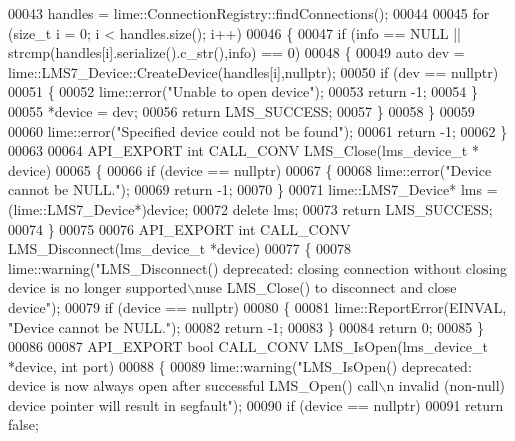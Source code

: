 \begin{DoxyCode}
00043     handles = lime::ConnectionRegistry::findConnections();
00044 
00045     \textcolor{keywordflow}{for} (\textcolor{keywordtype}{size\_t} i = 0; i < handles.size(); i++)
00046     \{
00047         \textcolor{keywordflow}{if} (info == NULL || strcmp(handles[i].serialize().c\_str(),info) == 0)
00048         \{
00049             \textcolor{keyword}{auto} dev = lime::LMS7_Device::CreateDevice(handles[i],\textcolor{keyword}{nullptr});
00050             \textcolor{keywordflow}{if} (dev == \textcolor{keyword}{nullptr})
00051             \{
00052                 lime::error(\textcolor{stringliteral}{"Unable to open device"});
00053                 \textcolor{keywordflow}{return} -1;
00054             \}
00055             *device = dev;
00056             \textcolor{keywordflow}{return} LMS_SUCCESS;
00057         \}
00058     \}
00059 
00060     lime::error(\textcolor{stringliteral}{"Specified device could not be found"});
00061     \textcolor{keywordflow}{return} -1;
00062 \}
00063 
00064 API_EXPORT \textcolor{keywordtype}{int} CALL_CONV LMS_Close(lms_device_t * device)
00065 \{
00066     \textcolor{keywordflow}{if} (device == \textcolor{keyword}{nullptr})
00067     \{
00068         lime::error(\textcolor{stringliteral}{"Device cannot be NULL."});
00069         \textcolor{keywordflow}{return} -1;
00070     \}
00071     lime::LMS7_Device* lms = (lime::LMS7_Device*)device;
00072     \textcolor{keyword}{delete} lms;
00073     \textcolor{keywordflow}{return} LMS_SUCCESS;
00074 \}
00075 
00076 API_EXPORT \textcolor{keywordtype}{int} CALL_CONV LMS_Disconnect(lms_device_t *device)
00077 \{
00078     lime::warning(\textcolor{stringliteral}{"LMS\_Disconnect() deprecated: closing connection without closing device is no longer
       supported\(\backslash\)nuse LMS\_Close() to disconnect and close device"});
00079     \textcolor{keywordflow}{if} (device == \textcolor{keyword}{nullptr})
00080     \{
00081         lime::ReportError(EINVAL, \textcolor{stringliteral}{"Device cannot be NULL."});
00082         \textcolor{keywordflow}{return} -1;
00083     \}
00084     \textcolor{keywordflow}{return} 0;
00085 \}
00086 
00087 API_EXPORT \textcolor{keywordtype}{bool} CALL_CONV LMS_IsOpen(lms_device_t *device, \textcolor{keywordtype}{int} port)
00088 \{
00089     lime::warning(\textcolor{stringliteral}{"LMS\_IsOpen() deprecated: device is now always open after successful LMS\_Open() call\(\backslash\)n
      invalid (non-null) device pointer will result in segfault"});
00090     \textcolor{keywordflow}{if} (device == \textcolor{keyword}{nullptr})
00091         \textcolor{keywordflow}{return} \textcolor{keyword}{false};

\end{DoxyCode}
